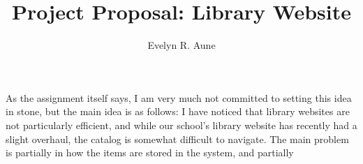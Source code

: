 \documentclass[12pt,letterpaper,notitlepage]{report}
\title{Project Proposal: Library Website}
\author{Evelyn R. Aune}
\begin{document}
\maketitle

As the assignment itself says, I am very much not committed to setting this idea in stone, but the main idea is as follows: I have noticed that library websites are not particularly efficient, and while our school's library website has recently had a slight overhaul, the catalog is somewhat difficult to navigate. The main problem is partially in how the items are stored in the system, and partially  
\end{document}
